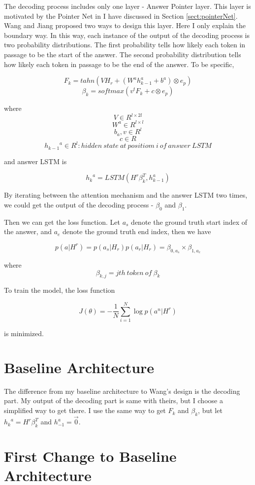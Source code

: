 \documentclass[modernstyle,12pt]{sjsuthesis}
\theoremstyle{definition}
\begin{document}
The decoding process includes only one layer - Answer Pointer layer. This layer is motivated by the Pointer Net in \cite{vinyals2015pointer} I have discussed in Section \ref{sect:pointerNet}. Wang and Jiang proposed two ways to design this layer. Here I only explain the boundary way. In this way, each instance of the output of the decoding process is two probability distributions. The first probability tells how likely each token in passage to be the start of the answer. The second probability distribution tells how likely each token in passage to be the end of the answer. To be specific,

$$F_k = tahn(VH_r + (W^a{h^a_{k-1}} +  b^a) \otimes e_p)$$
$$\beta _k = softmax(v^tF_k + c \otimes e_p)$$


where
$$V \in R^{l \times 2l}$$
$$W^a\in R^{l \times l} $$
$$b_a, v\in R^{l}  $$
$$c \in R $$
$${h_{k-1}}^a\in R^{l}: hidden\ state\ at\ positiom\ i\ of\ answer\ LSTM  $$

and answer LSTM is


$${h_k}^a = LSTM(H^r\beta _k^T, h_{k-1}^a)$$

By iterating between the attention mechanism and the answer LSTM two times, we could get the output of the decoding process - $\beta _0$ and $\beta _1$.


Then we can get the loss function. Let $a_s$ denote the ground truth start index of the answer, and $a_e$ denote the ground truth end index, then we have

$$p(a|H^r) = p(a_s|H_r)p(a_r|H_r)=\beta _{0, a_s} \times \beta_{1, a_e}$$

where $$\beta_{k, j} = jth\ token\ of\ \beta _k$$

To train the model, the loss function

$$J(\theta) = -\frac{1}{N}\sum_{i=1}^{N} \log{p(a^n|H^r)} $$

is minimized.

\section{Baseline Architecture}

The difference from my baseline architecture to Wang's design is the decoding part. My output of the decoding part is same with theirs, but I choose a simplified way to get there. I use the same way to get $F_k$ and $\beta _k$, but let ${h_k}^a = H^r\beta _{k}^T$ and $h_{-1}^a = \overrightarrow{0}$.

\section{First Change to Baseline Architecture}
\end{document}
